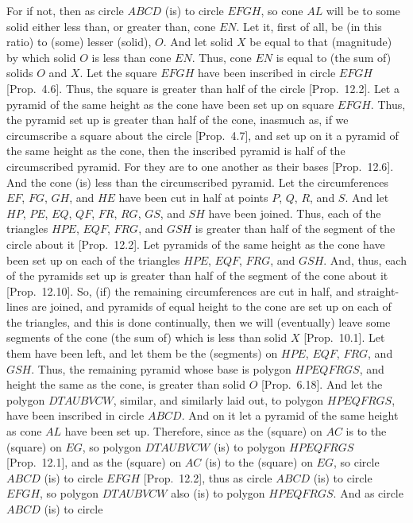 For if not, then as circle $ABCD$ (is) to circle $EFGH$, so cone $AL$ will be to some solid either less than, or
greater than, cone $EN$. Let it, first of all, be (in this ratio) to (some) lesser (solid), $O$. And let solid $X$ be equal to
that (magnitude) by which solid $O$ is less than cone $EN$. Thus, cone $EN$ is equal to (the sum of) solids
$O$ and $X$. Let the square $EFGH$ have been inscribed in circle $EFGH$ [Prop.~4.6].
Thus, the square is greater than half of the circle [Prop.~12.2]. Let a pyramid
of the same height as the cone have been set up on square $EFGH$. Thus, the pyramid set up is
greater than half of the cone, inasmuch as, if we circumscribe a square about the circle [Prop.~4.7], and set up  on it a pyramid of the same height as the cone, then the inscribed pyramid
is half of the circumscribed pyramid.  For they are to one another as their 
bases [Prop.~12.6]. And the cone (is) less than the circumscribed pyramid. 
Let the circumferences $EF$, $FG$, $GH$, and $HE$ have been cut in half at points $P$, $Q$, $R$,
and $S$. And let $HP$, $PE$, $EQ$, $QF$, $FR$, $RG$, $GS$, and $SH$ have been joined.
Thus, each of the triangles $HPE$, $EQF$, $FRG$, and $GSH$ is greater than half of the segment of
the circle about it [Prop.~12.2]. Let pyramids of the same height
as the cone have been set up on each of the triangles $HPE$, $EQF$, $FRG$, and $GSH$.  And, thus, each of
the pyramids set up is greater than half of the segment of the cone about it [Prop.~12.10].
So, (if) the remaining circumferences are cut in half, and straight-lines are joined, and pyramids  of equal height to the cone are
set up on each of the triangles, and this is 
done continually, then we will (eventually) leave some segments of the cone (the sum of) which is less 
than solid $X$ [Prop.~10.1]. Let them have been left, and let them be the
(segments) on $HPE$, $EQF$, $FRG$, and $GSH$. Thus, the remaining pyramid whose base is
polygon $HPEQFRGS$, and height the same as the cone, is greater than solid $O$ [Prop.~6.18]. 
And let the polygon $DTAUBVCW$, similar, and similarly laid out, to polygon $HPEQFRGS$, have been
inscribed in circle $ABCD$. And on it let a pyramid of the same height as cone 
$AL$ have been set up.
Therefore, since as the (square) on $AC$ is to the (square) on $EG$, so polygon $DTAUBVCW$ (is) to
polygon $HPEQFRGS$ [Prop.~12.1], and as the (square) on $AC$ (is) to the (square) on $EG$,
so circle $ABCD$ (is) to circle $EFGH$ [Prop.~12.2], thus as circle $ABCD$ (is) to
circle $EFGH$, so polygon $DTAUBVCW$ also (is) to polygon $HPEQFRGS$. And as circle $ABCD$ (is) to circle
